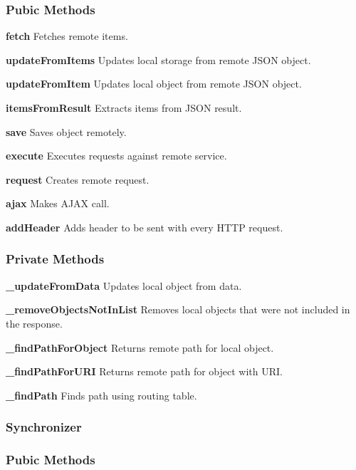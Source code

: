 \subsubsection*{Pubic Methods}
\item
\textbf{fetch}
Fetches remote items.
\item
\textbf{updateFromItems}
Updates local storage from remote JSON object.
\item
\textbf{updateFromItem}
Updates local object from remote JSON object.
\item
\textbf{itemsFromResult}
Extracts items from JSON result.
\item
\textbf{save}
Saves object remotely.
\item
\textbf{execute}
Executes requests against remote service.
\item
\textbf{request}
Creates remote request.
\item
\textbf{ajax}
Makes AJAX call.
\item
\textbf{addHeader}
Adds header to be sent with every HTTP request.

\subsubsection*{Private Methods}
\item
\textbf{\_updateFromData}
Updates local object from data.
\item
\textbf{\_removeObjectsNotInList}
Removes local objects that were not included in the response.
\item
\textbf{\_findPathForObject}
Returns remote path for local object.
\item
\textbf{\_findPathForURI}
Returns remote path for object with URI.
\item
\textbf{\_findPath}
Finds path using routing table.

\subsubsection{Synchronizer}
\subsubsection*{Pubic Methods}

